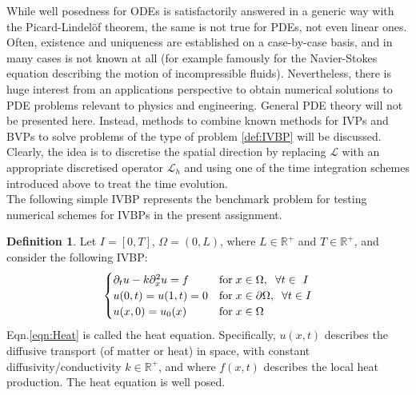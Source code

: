 \documentclass[11pt]{article}
\theoremstyle{theorem}
\theoremstyle{definition}
\newtheorem{definition}{Definition}
\begin{document}
While well posedness for ODEs is satisfactorily answered in a generic way with the Picard-Lindelöf theorem, the same is not true for PDEs, not even linear ones. Often,
existence and uniqueness are established on a case-by-case basis, and in many cases is not known at all (for example famously for the Navier-Stokes equation describing the motion of incompressible fluids). Nevertheless, there is huge interest from an applications perspective to obtain numerical solutions to PDE problems relevant to physics and
engineering. General PDE theory will not be presented here. Instead, methods to combine known methods for IVPs and BVPs to solve problems of the type of problem \ref{def:IVBP} will be discussed. Clearly, the idea is to discretise the spatial direction by replacing $\mathcal{L}$ with an appropriate discretised operator $\mathcal{L}_h$ and using one of the time integration schemes introduced above to treat the time evolution.\\

The following simple IVBP represents the benchmark problem for testing numerical schemes for IVBPs in the present assignment.\\

\begin{definition}
	\label{def:Heat}
	Let $I=[0,T]$, $\Omega=(0,L)$, where $L\in\mathbb{R}^+$ and $T\in\mathbb{R}^+$, and consider the following IVBP:
	\begin{align}
	\label{eqn:Heat}
	\begin{cases}
	\partial_t u - k\partial^2_x u = f &\text{for}\hspace{1mm}x\in\Omega,\hspace{2mm}\forall t\in\ I\\
	u(0, t)=u(1, t)=0 &\text{for}\hspace{1mm}x\in\partial\Omega,\hspace{2mm}\forall t\in I\\
	u(x,0)=u_0(x) &\text{for}\hspace{1mm}x\in\Omega
	\end{cases}
	\end{align} 
	Eqn.\eqref{eqn:Heat} is called the heat equation. Specifically, $u(x,t)$ 	describes the diffusive transport (of matter or heat) in space, with constant diffusivity/conductivity $k\in\mathbb{R}^+$, and where $f(x,t)$ describes
	the local heat production. The heat equation is well posed.\\
\end{definition}
\end{document}
